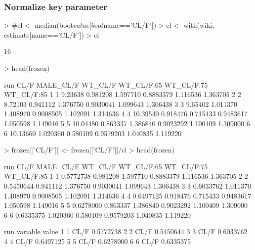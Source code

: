 \subsubsection{Normalize key parameter}
\begin{Schunk}
\begin{Sinput}
> #cl <- median(boot$value[boot$name=='CL/F'])
> cl <- with(wiki, estimate[name=='CL/F'])
> cl
\end{Sinput}
\begin{Soutput}
[1] 16
\end{Soutput}
\begin{Sinput}
> head(frozen)
\end{Sinput}
\begin{Soutput}
  run     CL/F MALE_CL/F  WT_CL/F WT_CL/F:65 WT_CL/F:75 WT_CL/F:85
1   1  9.23638  0.981208 1.597710  0.8883379   1.116536   1.363705
2   2  8.72103  0.941112 1.376750  0.9030041   1.099643   1.306438
3   3  9.65402  1.011370 1.408970  0.9008505   1.102091   1.314636
4   4 10.39540  0.918476 0.715433  0.9483617   1.050598   1.149016
5   5 10.04480  0.863337 1.386840  0.9023292   1.100409   1.309000
6   6 10.13660  1.020360 0.580109  0.9579203   1.040835   1.119220
\end{Soutput}
\begin{Sinput}
> frozen[['CL/F']] <- frozen[['CL/F']]/cl
> head(frozen)
\end{Sinput}
\begin{Soutput}
  run      CL/F MALE_CL/F  WT_CL/F WT_CL/F:65 WT_CL/F:75 WT_CL/F:85
1   1 0.5772738  0.981208 1.597710  0.8883379   1.116536   1.363705
2   2 0.5450644  0.941112 1.376750  0.9030041   1.099643   1.306438
3   3 0.6033762  1.011370 1.408970  0.9008505   1.102091   1.314636
4   4 0.6497125  0.918476 0.715433  0.9483617   1.050598   1.149016
5   5 0.6278000  0.863337 1.386840  0.9023292   1.100409   1.309000
6   6 0.6335375  1.020360 0.580109  0.9579203   1.040835   1.119220
\end{Soutput}
\begin{Soutput}
  run variable     value
1   1     CL/F 0.5772738
2   2     CL/F 0.5450644
3   3     CL/F 0.6033762
4   4     CL/F 0.6497125
5   5     CL/F 0.6278000
6   6     CL/F 0.6335375
\end{Soutput}
\end{Schunk}
